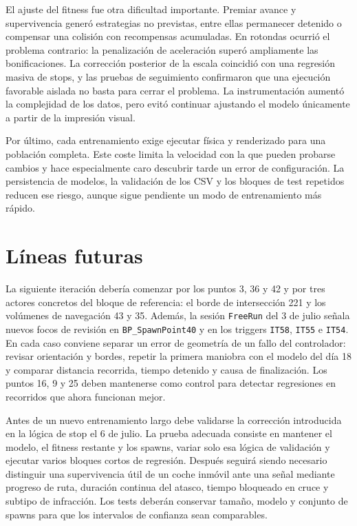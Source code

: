 El ajuste del fitness fue otra dificultad importante. Premiar avance y supervivencia generó estrategias no previstas, entre ellas permanecer detenido o compensar una colisión con recompensas acumuladas. En rotondas ocurrió el problema contrario: la penalización de aceleración superó ampliamente las bonificaciones. La corrección posterior de la escala coincidió con una regresión masiva de stops, y las pruebas de seguimiento confirmaron que una ejecución favorable aislada no basta para cerrar el problema. La instrumentación aumentó la complejidad de los datos, pero evitó continuar ajustando el modelo únicamente a partir de la impresión visual.

Por último, cada entrenamiento exige ejecutar física y renderizado para una población completa. Este coste limita la velocidad con la que pueden probarse cambios y hace especialmente caro descubrir tarde un error de configuración. La persistencia de modelos, la validación de los CSV y los bloques de test repetidos reducen ese riesgo, aunque sigue pendiente un modo de entrenamiento más rápido.

\section{Líneas futuras}

La siguiente iteración debería comenzar por los puntos 3, 36 y 42 y por tres actores concretos del bloque de referencia: el borde de intersección 221 y los volúmenes de navegación 43 y 35. Además, la sesión \texttt{FreeRun} del 3 de julio señala nuevos focos de revisión en \texttt{BP\_SpawnPoint40} y en los triggers \texttt{IT58}, \texttt{IT55} e \texttt{IT54}. En cada caso conviene separar un error de geometría de un fallo del controlador: revisar orientación y bordes, repetir la primera maniobra con el modelo del día 18 y comparar distancia recorrida, tiempo detenido y causa de finalización. Los puntos 16, 9 y 25 deben mantenerse como control para detectar regresiones en recorridos que ahora funcionan mejor.

Antes de un nuevo entrenamiento largo debe validarse la corrección introducida en la lógica de stop el 6 de julio. La prueba adecuada consiste en mantener el modelo, el fitness restante y los spawns, variar solo esa lógica de validación y ejecutar varios bloques cortos de regresión. Después seguirá siendo necesario distinguir una supervivencia útil de un coche inmóvil ante una señal mediante progreso de ruta, duración continua del atasco, tiempo bloqueado en cruce y subtipo de infracción. Los tests deberán conservar tamaño, modelo y conjunto de spawns para que los intervalos de confianza sean comparables.


